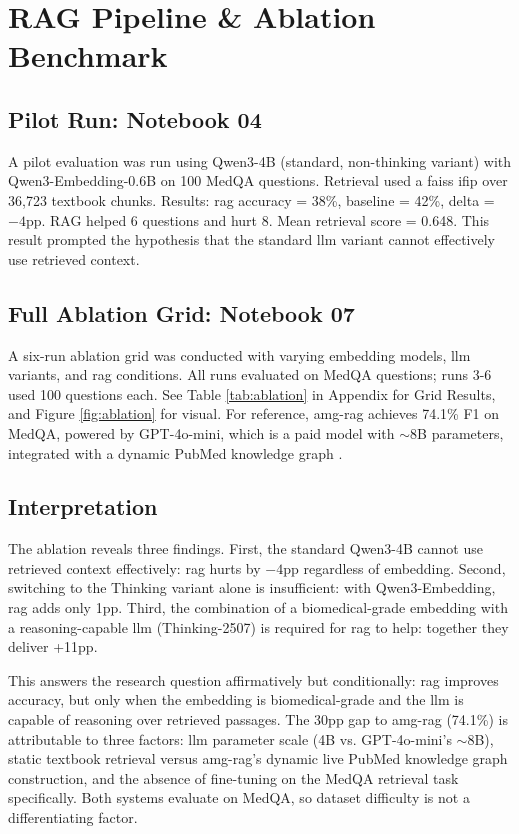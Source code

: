 \chapter{RAG Pipeline \& Ablation Benchmark}
\label{ch:ablation}

\section{Pilot Run: Notebook 04}

A pilot evaluation was run using Qwen3-4B (standard, non-thinking variant) with Qwen3-Embedding-0.6B on 100 MedQA questions. Retrieval used a \gls{faiss} \gls{ifip} \cite{johnson_billionscale_2019} over 36,723 textbook chunks. Results: \gls{rag} accuracy = 38\%, baseline = 42\%, delta = $-4$\gls{pp}. RAG helped 6 questions and hurt 8. Mean retrieval score = 0.648. This result prompted the hypothesis that the standard \gls{llm} variant cannot effectively use retrieved context. 

\section{Full Ablation Grid: Notebook 07}
A six-run ablation grid was conducted with varying embedding models, \gls{llm} variants, and \gls{rag} conditions. All runs evaluated on MedQA questions; runs 3-6 used 100 questions each. See Table \ref{tab:ablation} in Appendix for Grid Results, and Figure \ref{fig:ablation} for visual. For reference, \gls{amg-rag} achieves 74.1\% F1 on MedQA, powered by GPT-4o-mini, which is a paid model with $\sim$8B parameters, integrated with a dynamic PubMed knowledge graph \cite{rezaei_agentic_2025}. 

\section{Interpretation}

The ablation reveals three findings. First, the standard Qwen3-4B cannot use retrieved context effectively: \gls{rag} hurts by $-4$\gls{pp} regardless of embedding. Second, switching to the Thinking variant alone is insufficient: with Qwen3-Embedding, \gls{rag} adds only 1\gls{pp}. Third, the combination of a biomedical-grade embedding with a reasoning-capable \gls{llm} (Thinking-2507) is required for \gls{rag} to help: together they deliver +11\gls{pp}.

This answers the research question affirmatively but conditionally: \gls{rag} improves accuracy, but only when the embedding is biomedical-grade and the \gls{llm} is capable of reasoning over retrieved passages. The 30\gls{pp} gap to \gls{amg-rag} (74.1\%) is attributable to three factors: \gls{llm} parameter scale (4B vs. GPT-4o-mini's $\sim$8B), static textbook retrieval versus \gls{amg-rag}'s dynamic live PubMed knowledge graph construction, and the absence of fine-tuning on the MedQA retrieval task specifically. Both systems evaluate on MedQA, so dataset difficulty is not a differentiating factor.